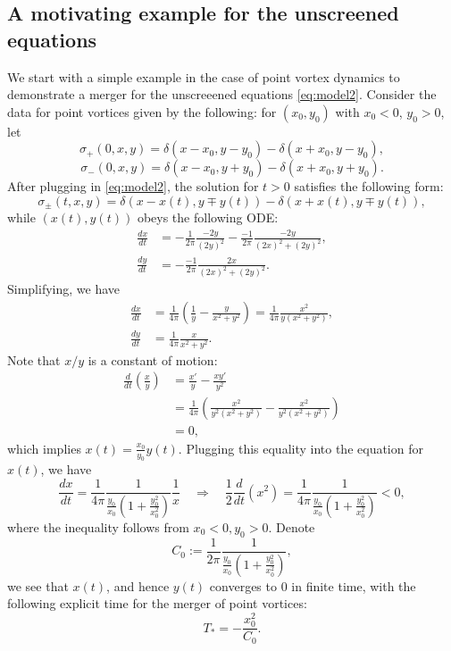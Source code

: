 \documentclass[11pt,reqno]{amsproc}
\begin{document}
\subsection{A motivating example for the unscreened equations}
We start with a simple example in the case of point vortex dynamics to demonstrate a merger  for the unscreeened equations \eqref{eq:model2}. Consider the data for point vortices given by the following: for $(x_0, y_0)$ with $x_0 < 0$, $y_0 > 0$, let
    $$
    \sigma_+(0,x,y) = \delta(x-x_0, y-y_0) - \delta(x+x_0, y-y_0),
    $$
    $$
    \sigma_-(0,x,y) = \delta(x-x_0, y+y_0) - \delta(x+x_0, y+y_0).
    $$
    After plugging in \eqref{eq:model2}, the solution for $t > 0$ satisfies the following form:
    $$
    \sigma_\pm(t,x,y) = \delta(x-x(t), y\mp y(t)) - \delta(x+x(t), y\mp y(t)),
    $$
    while $(x(t),y(t))$ obeys the following ODE:
    \begin{align}
        \frac{dx}{dt} &= -\frac{1}{2\pi}\frac{-2y}{(2y)^2} - \frac{-1}{2\pi} \frac{-2y}{(2x)^2 + (2y)^2},\\
        \frac{dy}{dt} &= -\frac{-1}{2\pi}\frac{2x}{(2x)^2 + (2y)^2}.
    \end{align}
    Simplifying, we have
    \begin{align}
        \frac{dx}{dt} &= \frac{1}{4\pi}\left(\frac1y - \frac{y}{x^2 + y^2}\right) = \frac{1}{4\pi}\frac{x^2}{y(x^2 + y^2)},\\
        \frac{dy}{dt} &= \frac{1}{4\pi}\frac{x}{x^2 + y^2}.
    \end{align}
    Note that $x/y$ is a constant of motion:
    \begin{align*}
        \frac{d}{dt}\left(\frac{x}{y}\right) &= \frac{x'}{y} - \frac{xy'}{y^2}\\
        &= \frac{1}{4\pi}\left(\frac{x^2}{y^2(x^2 + y^2)} - \frac{x^2}{y^2(x^2 + y^2)}\right)\\
        &= 0,
    \end{align*}
    which implies $x(t) = \frac{x_0}{y_0}y(t)$. Plugging this equality into the equation for $x(t)$, we have
    $$
    \frac{dx}{dt} = \frac{1}{4\pi}\frac{1}{\frac{y_0}{x_0}(1+\frac{y_0^2}{x_0^2})}\frac1x \quad\Rightarrow \quad \frac{1}{2}\frac{d}{dt} (x^2) = \frac{1}{4\pi}\frac{1}{\frac{y_0}{x_0}(1+\frac{y_0^2}{x_0^2})} < 0,
    $$
    where the inequality follows from $x_0 < 0, y_0 > 0$. Denote 
    $$
    C_0 := \frac{1}{2\pi}\frac{1}{\frac{y_0}{x_0}(1+\frac{y_0^2}{x_0^2})},
    $$
    we see that $x(t)$, and hence $y(t)$ converges to $0$ in finite time, with the following explicit time for the merger of point vortices:
    $$
    T_* = -\frac{x_0^2}{C_0}.
    $$
\end{document}
